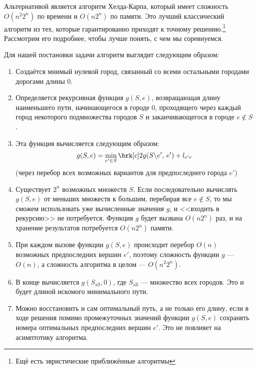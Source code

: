 
Альтернативой является алгоритм Хелда-Карпа, который имеет сложность $O(n^2 2^n)$ по времени и $O(n 2^n)$ по памяти. Это лучший классический алгоритм из тех, которые гарантированно приходят к точному решению.\footnote{Ещё есть эвристические приближённые алгоритмы} Рассмотрим его подробнее, чтобы лучше понять, с чем мы соревнуемся.%

Для нашей постановки задачи алгоритм
выглядит следующим образом:

\begin{enumerate}

    \item Создаётся мнимый нулевой город, связанный со всеми остальными городами дорогами длины 0.
    
    \item Определяется рекурсивная функция $g(S, e)$, возвращающая длину наименьшего пути, начинающегося в городе 0, проходящего через каждый город некоторого подмножества городов $S$ и заканчивающегося в городе $e \notin S$. 
    
    \item Эта функция вычисляется следующим образом:
    \[
    g(S,e) = \min_{e' \in S} \brk[c]2{
        g(S\backslash e',\, e') + l_{e'e}
    }
    \]
    (через перебор всех возможных вариантов для предпоследнего города $e'$)

    \item Существует $2^n$ возможных множеств $S$. Если последовательно вычислять $g(S,e)$ от меньших множеств к большим, перебирая все $e \notin S$, то мы сможем использовать уже вычисленные значения $g$, и <<входить в рекурсию>> не потребуется. Функция $g$ будет вызвана $O(n2^n)$ раз, и на хранение результатов потребуется $O(n2^n)$ памяти.
    
    \item При каждом вызове функции $g(S,e)$ происходит перебор $O(n)$ возможных предпоследних вершин $e'$, поэтому сложность функции $g$ --- $O(n)$, а сложность алгоритма в целом --- $O(n^2 2^n)$.
    
    \item В конце вычисляется $g(S_{\text{all}}, 0)$, где $S_{\text{all}}$ --- множество всех городов. Это и будет длиной искомого минимального пути.
    
    \item Можно восстановить и сам оптимальный путь, а не только его длину, если в ходе решения помимо промежуточных значений функции $g(S,e)$ сохранять номера оптимальных предпоследних вершин $e'$. Это не повлияет на асимптотику алгоритма.

\end{enumerate}

